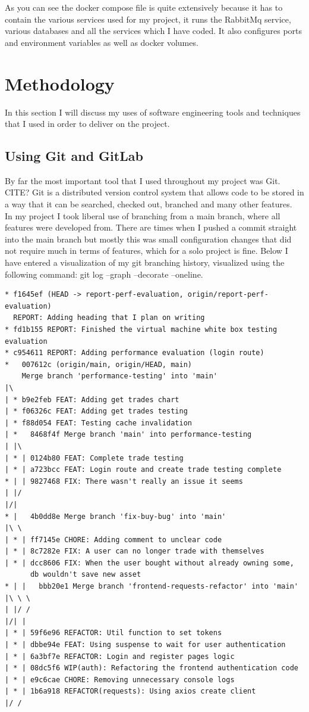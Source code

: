 \documentclass[titlepage]{article}
\begin{document}
As you can see the docker compose file is quite extensively because it has to contain the various services used for my project, it runs the RabbitMq service, various databases and all the services which I have coded. It also configures ports and environment variables as well as docker volumes.

\pagebreak

\section{Methodology}
In this section I will discuss my uses of software engineering tools and techniques that I used in order to deliver on the project.

\subsection{Using Git and GitLab}
By far the most important tool that I used throughout my project was Git. CITE? Git is a distributed version control system that allows code to be stored in a way that it can be searched, checked out, branched and many other features. \\

In my project I took liberal use of branching from a main branch, where all features were developed from. There are times when I pushed a commit straight into the main branch but mostly this was small configuration changes that did not require much in terms of features, which for a solo project is fine. Below I have entered a visualization of my git branching history, visualized using the following command: git log --graph --decorate --oneline.

\begin{verbatim}
* f1645ef (HEAD -> report-perf-evaluation, origin/report-perf-evaluation) 
  REPORT: Adding heading that I plan on writing
* fd1b155 REPORT: Finished the virtual machine white box testing evaluation
* c954611 REPORT: Adding performance evaluation (login route)
*   007612c (origin/main, origin/HEAD, main) 
    Merge branch 'performance-testing' into 'main'
|\
| * b9e2feb FEAT: Adding get trades chart
| * f06326c FEAT: Adding get trades testing
| * f88d054 FEAT: Testing cache invalidation
| *   8468f4f Merge branch 'main' into performance-testing
| |\
| * | 0124b80 FEAT: Complete trade testing
| * | a723bcc FEAT: Login route and create trade testing complete
* | | 9827468 FIX: There wasn't really an issue it seems
| |/
|/|
* |   4b0dd8e Merge branch 'fix-buy-bug' into 'main'
|\ \
| * | ff7145e CHORE: Adding comment to unclear code
| * | 8c7282e FIX: A user can no longer trade with themselves
| * | dcc8606 FIX: When the user bought without already owning some,
      db wouldn't save new asset
* | |   bbb20e1 Merge branch 'frontend-requests-refactor' into 'main'
|\ \ \
| |/ /
|/| |
| * | 59f6e96 REFACTOR: Util function to set tokens
| * | dbbe94e FEAT: Using suspense to wait for user authentication
| * | 6a3bf7e REFACTOR: Login and register pages logic
| * | 08dc5f6 WIP(auth): Refactoring the frontend authentication code
| * | e9c6cae CHORE: Removing unnecessary console logs
| * | 1b6a918 REFACTOR(requests): Using axios create client
|/ /
\end{verbatim}
\end{document}
